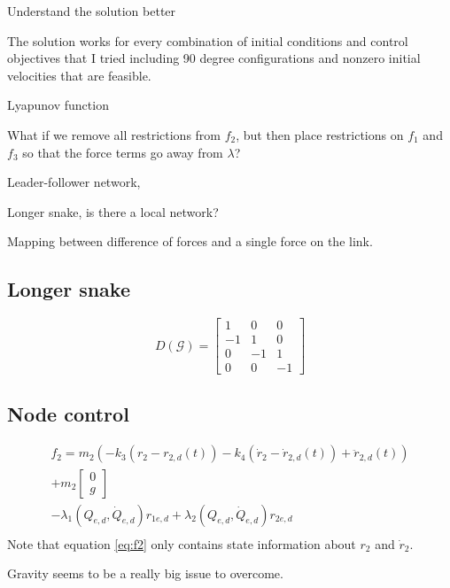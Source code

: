 \documentclass[conference]{IEEEtran}
\begin{document}
Understand the solution better

The solution works for every combination of initial conditions and control objectives that I tried including 90 degree configurations and nonzero initial velocities that are feasible.

Lyapunov function

What if we remove all restrictions from $f_2$, but then place restrictions on $f_1$ and $f_3$ so that the force terms go away from $\lambda$?

Leader-follower network, 

Longer snake, is there a local network?

Mapping between difference of forces and a single force on the link.

\subsection{Longer snake}
$$D(\mathcal{G})=\begin{bmatrix}
    1 & 0 & 0\\
    -1 & 1 & 0\\
    0 & -1 & 1\\
    0 & 0 & -1
\end{bmatrix}$$

\subsection{Node control}
\begin{multline} \label{eq:f2}
    f_2=m_2(-k_3(r_2-r_{2,d}(t)) - k_4(\dot{r}_2-\dot{r}_{2,d}(t)) + \ddot{r}_{2,d}(t))\\
    + m_2\begin{bmatrix} 0\\ g \end{bmatrix}\\
    - \lambda_1(Q_{e,d},\dot{Q}_{e,d})r_{1e,d} + \lambda_2(Q_{e,d},\dot{Q}_{e,d})r_{2e,d}\\
\end{multline}
Note that equation \ref{eq:f2} only contains state information about $r_2$ and $\dot{r}_2$.

Gravity seems to be a really big issue to overcome.
\end{document}
